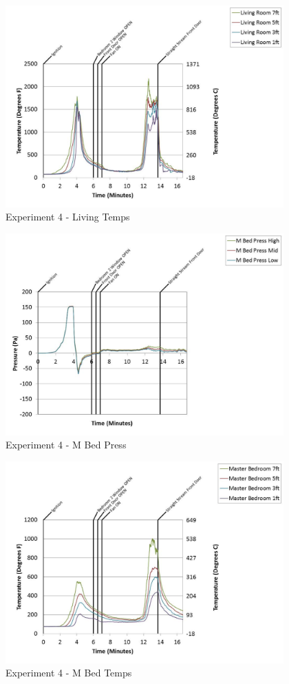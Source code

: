 \documentclass{article}
\begin{document}
\begin{appendices}
	\begin{figure}[h!]
		\centering
		\includegraphics[height=3.05in]{0_Images/Results_Charts/Exp_4_Charts/LivingTemps.pdf}
		\caption{Experiment 4 - Living Temps}
	\end{figure}
 
	\clearpage

	\begin{figure}[h!]
		\centering
		\includegraphics[height=3.05in]{0_Images/Results_Charts/Exp_4_Charts/MBedPress.pdf}
		\caption{Experiment 4 - M Bed Press}
	\end{figure}
 

	\begin{figure}[h!]
		\centering
		\includegraphics[height=3.05in]{0_Images/Results_Charts/Exp_4_Charts/MBedTemps.pdf}
		\caption{Experiment 4 - M Bed Temps}
	\end{figure}
 

\end{appendices}
\end{document}
